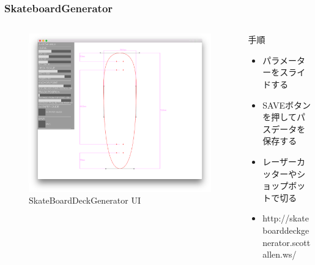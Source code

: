 \documentclass[10pt, dvipdfmx]{beamer}
\begin{document}
        \begin{frame}
            \frametitle{SkateboardGenerator}
            \tiny
            \begin{columns}[c]
                \begin{column}{0.50\textwidth}
                    \begin{figure}[htb]
                        \includegraphics[width=\columnwidth]{images/02.png}
                        \caption{SkateBoardDeckGenerator UI}
                        \label{fig:01}
                    \end{figure}
                \end{column}
                \begin{column}{0.50\textwidth}
                    \begin{block}{手順}
                        \begin{itemize}
                            \item パラメーターをスライドする
                            \item SAVEボタンを押してパスデータを保存する
                            \item レーザーカッターやショップボットで切る
                            \item http://skateboarddeckgenerator.scottallen.ws/
                        \end{itemize}
                    \end{block}
                \end{column}
            \end{columns}
        \end{frame}
\end{document}
